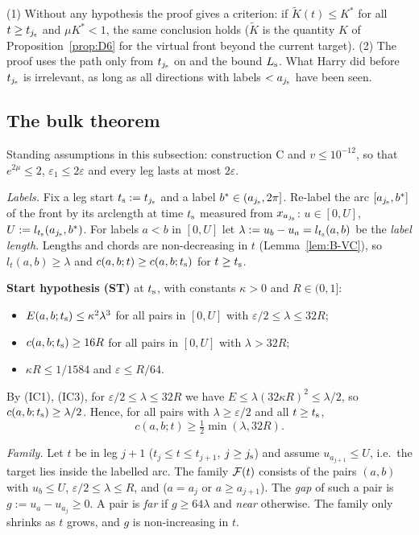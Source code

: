 \begin{remark}\label{rem:B-R}
(1) Without any hypothesis the proof gives a criterion: if $\tilde K(t)\le K^*$ for all $t\ge t_{j_{\mathrm s}}$ and $\mu K^*<1$, the same
conclusion holds ($\tilde K$ is the quantity $K$ of Proposition~\ref{prop:D6} for the virtual front beyond the current target).
(2) The proof uses the path only from $t_{j_{\mathrm s}}$ on and the bound $L_{\mathrm s}$. What Harry did before $t_{j_{\mathrm s}}$ is irrelevant, as long as
all directions with labels $<a_{j_{\mathrm s}}$ have been seen.
\end{remark}

\subsection{The bulk theorem}

Standing assumptions in this subsection: construction C and $v\le10^{-12}$, so that $e^{2\mu}\le2$, $\varepsilon_1\le2\varepsilon$
and every leg lasts at most $2\varepsilon$.

\emph{Labels.} Fix a leg start $t_{\mathrm s}:=t_{j_{\mathrm s}}$ and a label $b^*\in(a_{j_{\mathrm s}},2\pi]$. Re-label the arc $[a_{j_{\mathrm s}},b^*]$ of the front
by its arclength at time $t_{\mathrm s}$ measured from $x_{a_{j_{\mathrm s}}}$: $u\in[0,U]$, $U:=l_{t_{\mathrm s}}(a_{j_{\mathrm s}},b^*)$. For labels $a<b$ in
$[0,U]$ let $\lambda:=u_b-u_a=l_{t_{\mathrm s}}(a,b)$ be the \emph{label length}. Lengths and chords are non-decreasing in $t$
(Lemma~\ref{lem:B-VC}), so $l_t(a,b)\ge\lambda$ and $c(a,b;t)\ge c(a,b;t_{\mathrm s})$ for $t\ge t_{\mathrm s}$.

\medskip\noindent\textbf{Start hypothesis (ST)} at $t_{\mathrm s}$, with constants $\kappa>0$ and $R\in(0,1]$:
\begin{itemize}
\item[(IC1)] $E(a,b;t_{\mathrm s})\le\kappa^2\lambda^3$ for all pairs in $[0,U]$ with $\varepsilon/2\le\lambda\le32R$;
\item[(IC2)] $c(a,b;t_{\mathrm s})\ge16R$ for all pairs in $[0,U]$ with $\lambda>32R$;
\item[(IC3)] $\kappa R\le1/1584$ and $\varepsilon\le R/64$.
\end{itemize}
By (IC1), (IC3), for $\varepsilon/2\le\lambda\le32R$ we have $E\le\lambda(32\kappa R)^2\le\lambda/2$, so $c(a,b;t_{\mathrm s})\ge\lambda/2$.
Hence, for all pairs with $\lambda\ge\varepsilon/2$ and all $t\ge t_{\mathrm s}$,
\begin{equation}\label{eq:B-CA}
c(a,b;t)\ge\tfrac12\min(\lambda,32R).\tag{CA}
\end{equation}

\emph{Family.} Let $t$ be in leg $j+1$ ($t_j\le t\le t_{j+1}$, $j\ge j_{\mathrm s}$) and assume $u_{a_{j+1}}\le U$, i.e.\ the target lies
inside the labelled arc. The family $\mathcal F(t)$ consists of the pairs $(a,b)$ with $u_b\le U$, $\varepsilon/2\le\lambda\le R$, and
($a=a_j$ or $a\ge a_{j+1}$). The \emph{gap} of such a pair is $g:=u_a-u_{a_j}\ge0$. A pair is \emph{far} if $g\ge64\lambda$ and
\emph{near} otherwise. The family only shrinks as $t$ grows, and $g$ is non-increasing in $t$.

